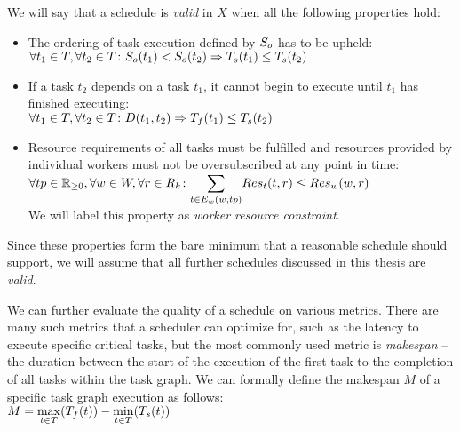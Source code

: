 We will say that a schedule is \emph{valid} in $X$ when all the following properties hold:

\begin{itemize}
	\item The ordering of task execution defined by $S_o$ has to be upheld: \\
	      $\forall t_1\in{}T, \forall t_2\in{}T\colon S_o(t_1) < S_o(t_2) \Rightarrow T_s(t_1) \leq T_s(t_2)$
	\item If a task $t_2$ depends on a task $t_1$, it cannot begin to
	      execute until $t_1$ has finished executing: \\ $\forall t_1\in{}T, \forall t_2\in{}T\colon D(t_1, t_2) \Rightarrow T_f(t_1) \leq T_s(t_2)$
	\item[\makedef{def:worker_resource_constraint}] Resource requirements of all tasks
	must be fulfilled and resources provided by individual workers must not be oversubscribed
	at any point in time: \\
	      $\forall tp\in\timedomain, \forall w\in{}W, \forall r\in{}\setresourcekinds\colon
		  \mathlarger{\sum}_{t\in{}\fnworkertaskassigned(w, tp)} \fntaskres(t, r) \leq \fnworkerres(w, r)$ \\
	We will label this property as \emph{worker resource constraint}.
\end{itemize}

Since these properties form the bare minimum that a reasonable schedule should support, we will
assume that all further schedules discussed in this thesis are \emph{valid}.

We can further evaluate the quality of a schedule on various metrics. There are many such metrics
that a scheduler can optimize for, such as the latency to execute specific
critical tasks, but the most commonly used metric is \emph{makespan} -- the duration
between the start of the execution of the first task to the completion of all tasks within the task
graph. We can formally define the makespan $M$ of a specific task graph
execution as follows: \\
$M = \max\limits_{t \in T}(T_f(t)) - \min\limits_{t \in T}(T_s(t))$


